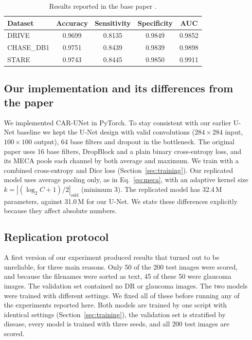 \documentclass[a4paper,fleqn]{cas-sc}
\begin{document}
\begin{table}[t]
\caption{Results reported in the base paper \citep{guo2021carunet}.}
\label{tab:paper}
\centering
\begin{tabular}{lcccc}
\toprule
Dataset & Accuracy & Sensitivity & Specificity & AUC \\
\midrule
DRIVE & 0.9699 & 0.8135 & 0.9849 & 0.9852 \\
CHASE\_DB1 & 0.9751 & 0.8439 & 0.9839 & 0.9898 \\
STARE & 0.9743 & 0.8445 & 0.9850 & 0.9911 \\
\bottomrule
\end{tabular}
\end{table}

\subsection{Our implementation and its differences from the paper}

We implemented CAR-UNet in PyTorch. To stay consistent with our earlier U-Net baseline we kept the U-Net design with valid convolutions ($284\times284$ input, $100\times100$ output), 64 base filters and dropout in the bottleneck. The original paper uses 16 base filters, DropBlock \citep{ghiasi2018dropblock} and a plain binary cross-entropy loss, and its MECA pools each channel by both average and maximum. We train with a combined cross-entropy and Dice loss (Section~\ref{sec:training}). Our replicated model uses average pooling only, as in Eq.~\eqref{eq:meca}, with an adaptive kernel size $k = |(\log_2 C + 1)/2|_{\text{odd}}$ (minimum 3). The replicated model has 32.4\,M parameters, against 31.0\,M for our U-Net. We state these differences explicitly because they affect absolute numbers.

\subsection{Replication protocol}

A first version of our experiment produced results that turned out to be unreliable, for three main reasons. Only 50 of the 200 test images were scored, and because the filenames were sorted as text, 45 of these 50 were glaucoma images. The validation set contained no DR or glaucoma images. The two models were trained with different settings. We fixed all of these before running any of the experiments reported here. Both models are trained by one script with identical settings (Section~\ref{sec:training}), the validation set is stratified by disease, every model is trained with three seeds, and all 200 test images are scored.
\end{document}
